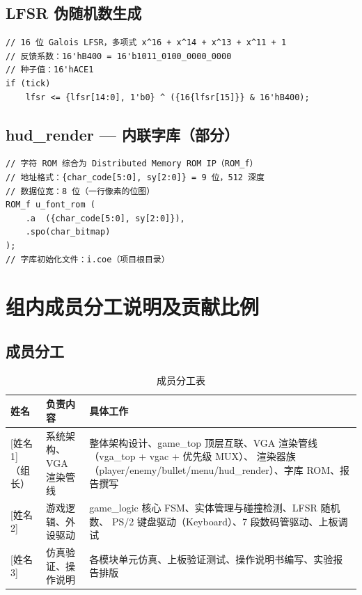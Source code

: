 \documentclass[12pt,a4paper]{ctexart}
\begin{document}
\subsection{LFSR 伪随机数生成}

\begin{lstlisting}
// 16 位 Galois LFSR，多项式 x^16 + x^14 + x^13 + x^11 + 1
// 反馈系数：16'hB400 = 16'b1011_0100_0000_0000
// 种子值：16'hACE1
if (tick)
    lfsr <= {lfsr[14:0], 1'b0} ^ ({16{lfsr[15]}} & 16'hB400);
\end{lstlisting}

\subsection{hud\_render --- 内联字库（部分）}

\begin{lstlisting}
// 字符 ROM 综合为 Distributed Memory ROM IP（ROM_f）
// 地址格式：{char_code[5:0], sy[2:0]} = 9 位，512 深度
// 数据位宽：8 位（一行像素的位图）
ROM_f u_font_rom (
    .a  ({char_code[5:0], sy[2:0]}),
    .spo(char_bitmap)
);
// 字库初始化文件：i.coe（项目根目录）
\end{lstlisting}


\section{组内成员分工说明及贡献比例}

\subsection{成员分工}


\begin{table}[H]
\centering
\caption{成员分工表}
\label{tab:division}
\begin{tabular}{lp{4.5cm}p{5cm}}
\toprule
\textbf{姓名} & \textbf{负责内容} & \textbf{具体工作} \\
\midrule
{[姓名1]}（组长） & 系统架构、VGA 渲染管线 &
    整体架构设计、game\_top 顶层互联、VGA 渲染管线（vga\_top + vgac + 优先级 MUX）、
    渲染器族（player/enemy/bullet/menu/hud\_render）、字库 ROM、报告撰写 \\
\midrule
{[姓名2]} & 游戏逻辑、外设驱动 &
    game\_logic 核心 FSM、实体管理与碰撞检测、LFSR 随机数、
    PS/2 键盘驱动（Keyboard）、7 段数码管驱动、上板调试 \\
\midrule
{[姓名3]} & 仿真验证、操作说明 &
    各模块单元仿真、上板验证测试、操作说明书编写、实验报告排版 \\
\bottomrule
\end{tabular}
\end{table}
\end{document}
